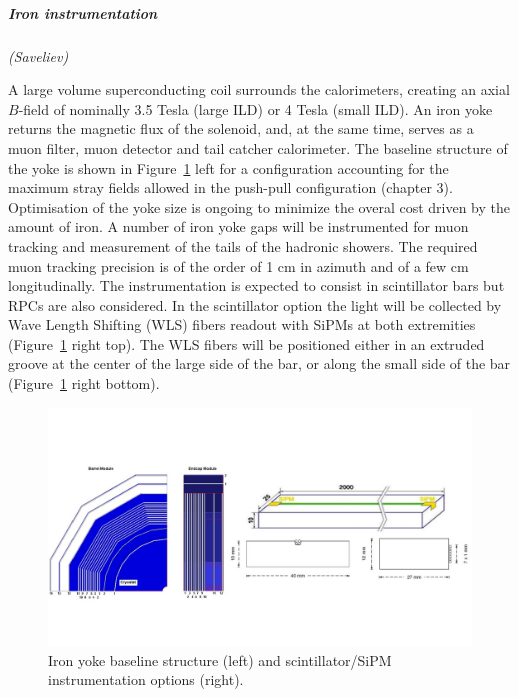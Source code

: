 \vspace{1cm}
\subparagraph*{\bf Iron instrumentation}
\textit{(Saveliev)}

A large volume superconducting coil surrounds the calorimeters, creating an axial $B$-field of nominally 3.5 Tesla (large ILD) or 4 Tesla (small ILD). An iron yoke returns the magnetic flux of the solenoid, and, at the same time, serves as a muon filter, muon detector and tail catcher calorimeter. The baseline structure of the yoke is shown in Figure~\ref{fig:det:yoke} left for a configuration accounting for the maximum stray fields allowed in the push-pull configuration (chapter 3). Optimisation of the yoke size is ongoing to minimize the overal cost driven by the amount of iron. A number of iron yoke gaps will be instrumented for muon tracking and measurement of the tails of the hadronic showers. The required muon tracking precision is of the order of 1 cm in azimuth and of a few cm longitudinally. The instrumentation is expected to consist in scintillator bars but RPCs are also considered. In the scintillator option the light will be collected by Wave Length Shifting (WLS) fibers readout with SiPMs at both extremities (Figure~\ref{fig:det:yoke} right top). The WLS fibers will be positioned either in an extruded groove at the center of the large side of the bar, or along the small side of the bar (Figure~\ref{fig:det:yoke} right bottom).  


\begin{figure}[t!]
\centering
\includegraphics[width=1.0\hsize]{Detector/fig/Iron_instrumentation.jpg}
\caption{Iron yoke baseline structure (left) and scintillator/SiPM instrumentation options (right).}
\label{fig:det:yoke}
\end{figure}

